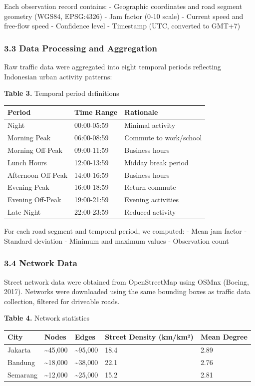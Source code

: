 \documentclass[
  12pt,
]{article}
\begin{document}
Each observation record contains: - Geographic coordinates and road segment geometry (WGS84, EPSG:4326) - Jam factor (0-10 scale) - Current speed and free-flow speed - Confidence level - Timestamp (UTC, converted to GMT+7)

\subsubsection{3.3 Data Processing and Aggregation}\label{data-processing-and-aggregation}

Raw traffic data were aggregated into eight temporal periods reflecting Indonesian urban activity patterns:

\textbf{Table 3.} Temporal period definitions

\begin{longtable}[]{@{}lll@{}}
\toprule\noalign{}
Period & Time Range & Rationale \\
\midrule\noalign{}
\endhead
\bottomrule\noalign{}
\endlastfoot
Night & 00:00-05:59 & Minimal activity \\
Morning Peak & 06:00-08:59 & Commute to work/school \\
Morning Off-Peak & 09:00-11:59 & Business hours \\
Lunch Hours & 12:00-13:59 & Midday break period \\
Afternoon Off-Peak & 14:00-16:59 & Business hours \\
Evening Peak & 16:00-18:59 & Return commute \\
Evening Off-Peak & 19:00-21:59 & Evening activities \\
Late Night & 22:00-23:59 & Reduced activity \\
\end{longtable}

For each road segment and temporal period, we computed: - Mean jam factor - Standard deviation - Minimum and maximum values - Observation count

\subsubsection{3.4 Network Data}\label{network-data}

Street network data were obtained from OpenStreetMap using OSMnx (Boeing, 2017). Networks were downloaded using the same bounding boxes as traffic data collection, filtered for driveable roads.

\textbf{Table 4.} Network statistics

\begin{longtable}[]{@{}lllll@{}}
\toprule\noalign{}
City & Nodes & Edges & Street Density (km/km²) & Mean Degree \\
\midrule\noalign{}
\endhead
\bottomrule\noalign{}
\endlastfoot
Jakarta & \textasciitilde45,000 & \textasciitilde95,000 & 18.4 & 2.89 \\
Bandung & \textasciitilde18,000 & \textasciitilde38,000 & 22.1 & 2.76 \\
Semarang & \textasciitilde12,000 & \textasciitilde25,000 & 15.2 & 2.81 \\
\end{longtable}
\end{document}
